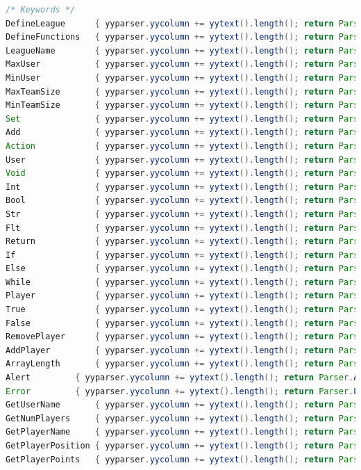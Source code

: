\documentclass[12pt]{report}
\begin{document}
\begin{singlespace}
\begin{lstlisting}[language=Java,label=some-code,caption={flood$\_$lex.flex}]
/* Keywords */
DefineLeague      { yyparser.yycolumn += yytext().length(); return Parser.DefineLeague;     }
DefineFunctions   { yyparser.yycolumn += yytext().length(); return Parser.DefineFunctions;  }
LeagueName        { yyparser.yycolumn += yytext().length(); return Parser.LeagueName;       }
MaxUser           { yyparser.yycolumn += yytext().length(); return Parser.MaxUser;          }
MinUser           { yyparser.yycolumn += yytext().length(); return Parser.MinUser;          }
MaxTeamSize       { yyparser.yycolumn += yytext().length(); return Parser.MaxTeamSize;      }
MinTeamSize       { yyparser.yycolumn += yytext().length(); return Parser.MinTeamSize;      }
Set               { yyparser.yycolumn += yytext().length(); return Parser.Set;              }
Add               { yyparser.yycolumn += yytext().length(); return Parser.Add;              }
Action            { yyparser.yycolumn += yytext().length(); return Parser.Action;           }
User              { yyparser.yycolumn += yytext().length(); return Parser.User;             }
Void              { yyparser.yycolumn += yytext().length(); return Parser.Void;             }
Int               { yyparser.yycolumn += yytext().length(); return Parser.Int;              }
Bool              { yyparser.yycolumn += yytext().length(); return Parser.Bool;             }
Str               { yyparser.yycolumn += yytext().length(); return Parser.Str;              }
Flt               { yyparser.yycolumn += yytext().length(); return Parser.Flt;              }
Return            { yyparser.yycolumn += yytext().length(); return Parser.Return;           }
If                { yyparser.yycolumn += yytext().length(); return Parser.If;               }
Else              { yyparser.yycolumn += yytext().length(); return Parser.Else;             }
While             { yyparser.yycolumn += yytext().length(); return Parser.While;            }
Player            { yyparser.yycolumn += yytext().length(); return Parser.Player;           }
True              { yyparser.yycolumn += yytext().length(); return Parser.True;             }
False             { yyparser.yycolumn += yytext().length(); return Parser.False;            }
RemovePlayer      { yyparser.yycolumn += yytext().length(); return Parser.RemovePlayer;     }
AddPlayer         { yyparser.yycolumn += yytext().length(); return Parser.AddPlayer;        }
ArrayLength       { yyparser.yycolumn += yytext().length(); return Parser.ArrayLength;      }
Alert		  { yyparser.yycolumn += yytext().length(); return Parser.Alert;            }
Error		  { yyparser.yycolumn += yytext().length(); return Parser.Error;            }
GetUserName       { yyparser.yycolumn += yytext().length(); return Parser.GetUserName;      }
GetNumPlayers     { yyparser.yycolumn += yytext().length(); return Parser.GetNumPlayers;    }
GetPlayerName     { yyparser.yycolumn += yytext().length(); return Parser.GetPlayerName;    }
GetPlayerPosition { yyparser.yycolumn += yytext().length(); return Parser.GetPlayerPosition;}
GetPlayerPoints   { yyparser.yycolumn += yytext().length(); return Parser.GetPlayerPoints;  }




\end{lstlisting}
\end{singlespace}
\end{document}
